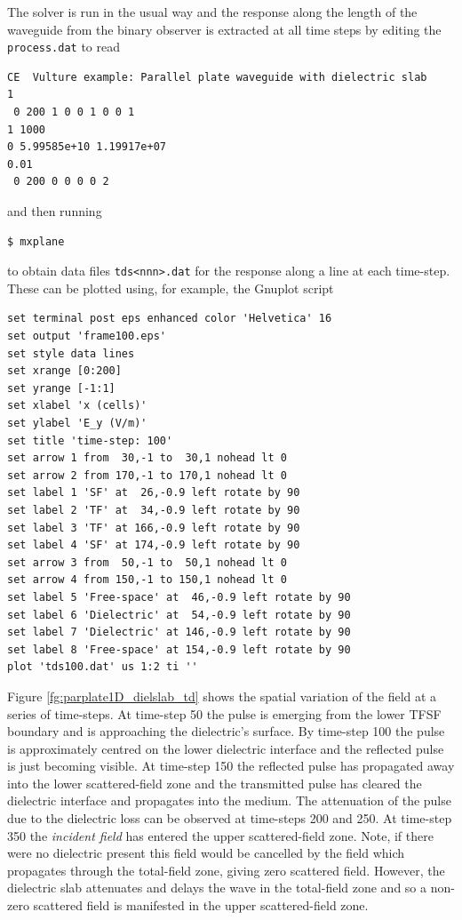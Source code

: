 \documentclass[onecolumn,a4paper]{article}
\numberwithin{equation}{section}
\begin{document}
The solver is run in the usual way and the response along the length of the waveguide from the
binary observer is extracted at all time steps by editing the \texttt{process.dat} to read
\begin{verbatim}
CE  Vulture example: Parallel plate waveguide with dielectric slab
1
 0 200 1 0 0 1 0 0 1
1 1000
0 5.99585e+10 1.19917e+07
0.01
 0 200 0 0 0 0 2
\end{verbatim}
and then running
\begin{verbatim}
$ mxplane
\end{verbatim}
to obtain data files \texttt{tds<nnn>.dat} for the response along a line at each time-step. These can be
plotted using, for example, the Gnuplot script
\begin{verbatim}
set terminal post eps enhanced color 'Helvetica' 16
set output 'frame100.eps'
set style data lines 
set xrange [0:200]
set yrange [-1:1]
set xlabel 'x (cells)'
set ylabel 'E_y (V/m)'
set title 'time-step: 100'
set arrow 1 from  30,-1 to  30,1 nohead lt 0
set arrow 2 from 170,-1 to 170,1 nohead lt 0
set label 1 'SF' at  26,-0.9 left rotate by 90
set label 2 'TF' at  34,-0.9 left rotate by 90
set label 3 'TF' at 166,-0.9 left rotate by 90
set label 4 'SF' at 174,-0.9 left rotate by 90
set arrow 3 from  50,-1 to  50,1 nohead lt 0
set arrow 4 from 150,-1 to 150,1 nohead lt 0
set label 5 'Free-space' at  46,-0.9 left rotate by 90
set label 6 'Dielectric' at  54,-0.9 left rotate by 90
set label 7 'Dielectric' at 146,-0.9 left rotate by 90
set label 8 'Free-space' at 154,-0.9 left rotate by 90
plot 'tds100.dat' us 1:2 ti ''
\end{verbatim}

Figure \ref{fg:parplate1D_dielslab_td} shows the spatial variation of the field at a series of time-steps.
At time-step 50 the pulse is emerging from the lower TFSF boundary
and is approaching the dielectric's surface. By time-step 100 the pulse is approximately centred on the lower dielectric
interface and the reflected pulse is just becoming visible. At time-step 150 the reflected pulse has propagated away 
into the lower scattered-field zone and the transmitted pulse has cleared the dielectric interface and propagates 
into the medium. The attenuation of the pulse due to the dielectric loss can be observed at time-steps 200 and 250.
At time-step 350 the {\em incident field} has entered the upper scattered-field zone. Note, if there were no dielectric
present this field would be cancelled by the field which propagates through the total-field zone, giving zero scattered field.
However, the dielectric slab attenuates and delays the wave in the total-field zone and so a non-zero scattered field is 
manifested in the upper scattered-field zone.
\end{document}
